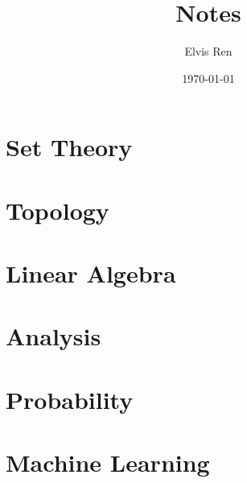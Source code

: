 



\title{Notes}
\author{Elvis Ren}
\date{\today}

\maketitle
\tableofcontents


\part{Set Theory}


\part{Topology}


\part{Linear Algebra}


\part{Analysis}


\part{Probability}


\part{Machine Learning}



